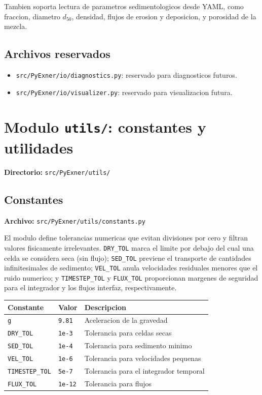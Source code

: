 \documentclass[11pt,a4paper]{article}
\newcommand{\code}[1]{\texttt{#1}}
\begin{document}
Tambien soporta lectura de parametros sedimentologicos desde YAML, como fraccion, diametro $d_{50}$,
densidad, flujos de erosion y deposicion, y porosidad de la mezcla.

\subsection{Archivos reservados}

\begin{itemize}[leftmargin=1.6em]
  \item \code{src/PyExner/io/diagnostics.py}: reservado para diagnosticos futuros.
  \item \code{src/PyExner/io/visualizer.py}: reservado para visualizacion futura.
\end{itemize}

\section{Modulo \code{utils/}: constantes y utilidades}

\textbf{Directorio:} \code{src/PyExner/utils/}

\subsection{Constantes}

\textbf{Archivo:} \code{src/PyExner/utils/constants.py}

El modulo define tolerancias numericas que evitan divisiones por cero y filtran valores
fisicamente irrelevantes. \code{DRY\_TOL} marca el limite por debajo del cual una celda se
considera seca (sin flujo); \code{SED\_TOL} previene el transporte de cantidades infinitesimales
de sedimento; \code{VEL\_TOL} anula velocidades residuales menores que el ruido numerico;
y \code{TIMESTEP\_TOL} y \code{FLUX\_TOL} proporcionan margenes de seguridad para el
integrador y los flujos interfaz, respectivamente.

\begin{tabularx}{\textwidth}{L{3.2cm}L{2.2cm}Y}
\toprule
Constante & Valor & Descripcion \\
\midrule
\code{g} & \code{9.81} & Aceleracion de la gravedad \\
\code{DRY\_TOL} & \code{1e-3} & Tolerancia para celdas secas \\
\code{SED\_TOL} & \code{1e-4} & Tolerancia para sedimento minimo \\
\code{VEL\_TOL} & \code{1e-6} & Tolerancia para velocidades pequenas \\
\code{TIMESTEP\_TOL} & \code{5e-7} & Tolerancia para el integrador temporal \\
\code{FLUX\_TOL} & \code{1e-12} & Tolerancia para flujos \\
\bottomrule
\end{tabularx}
\end{document}
